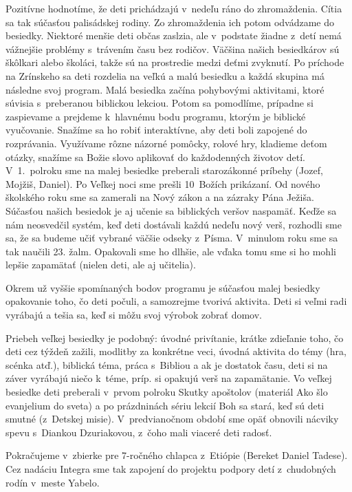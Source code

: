 Pozitívne hodnotíme, že deti prichádzajú v~nedeľu ráno do zhromaždenia. Cítia sa tak súčasťou palisádskej rodiny. Zo zhromaždenia ich potom odvádzame do besiedky. Niektoré menšie deti občas zaslzia, ale v~podstate žiadne z~detí nemá vážnejšie problémy s~trávením času bez rodičov. Väčšina našich besiedkárov sú škôlkari alebo školáci, takže sú na prostredie medzi deťmi zvyknutí.
Po príchode na Zrínskeho sa deti rozdelia na veľkú a malú besiedku a každá skupina má následne svoj program. Malá besiedka začína pohybovými aktivitami, ktoré súvisia s~preberanou biblickou lekciou. Potom sa pomodlíme, prípadne si zaspievame a prejdeme k~hlavnému bodu programu, ktorým je biblické vyučovanie. Snažíme sa ho robiť interaktívne, aby deti boli zapojené do rozprávania. Využívame rôzne názorné pomôcky, rolové hry, kladieme deťom otázky, snažíme sa Božie slovo aplikovať do každodenných životov detí.
V~1.~polroku sme na malej besiedke preberali starozákonné príbehy (Jozef, Mojžiš, Daniel). Po Veľkej noci sme prešli 10~Božích prikázaní. Od nového školského roku sme sa zamerali na Nový zákon a na zázraky Pána Ježiša. Súčasťou našich besiedok je aj učenie sa biblických veršov naspamäť. Keďže sa nám neosvedčil systém, keď deti dostávali každú nedeľu nový verš, rozhodli sme sa, že sa budeme učiť vybrané väčšie odseky z~Písma. V~minulom roku sme sa tak naučili 23. žalm. Opakovali sme ho dlhšie, ale vďaka tomu sme si ho mohli lepšie zapamätať (nielen deti, ale aj učitelia).

Okrem už vyššie spomínaných bodov programu je súčasťou malej besiedky opakovanie toho, čo deti počuli, a samozrejme tvorivá aktivita. Deti si veľmi radi vyrábajú a tešia sa, keď si môžu svoj výrobok zobrať domov.

Priebeh veľkej besiedky je podobný: úvodné privítanie, krátke zdieľanie toho, čo deti cez týždeň zažili, modlitby za konkrétne veci, úvodná aktivita do témy (hra, scénka atď.), biblická téma, práca s~Bibliou a ak je dostatok času, deti si na záver vyrábajú niečo k~téme, príp. si opakujú verš na zapamätanie.
Vo veľkej besiedke deti preberali v~prvom polroku Skutky apoštolov (materiál Ako šlo evanjelium do sveta) a po prázdninách sériu lekcií Boh sa stará, keď sú deti smutné (z~Detskej misie).
V~predvianočnom období sme opäť obnovili nácviky spevu s~Diankou Dzuriakovou, z~čoho mali viaceré deti radosť.

Pokračujeme v~zbierke pre 7-ročného chlapca z~Etiópie (Bereket Daniel Tadese). Cez nadáciu Integra sme tak zapojení do projektu podpory detí z~chudobných rodín v~meste Yabelo.

